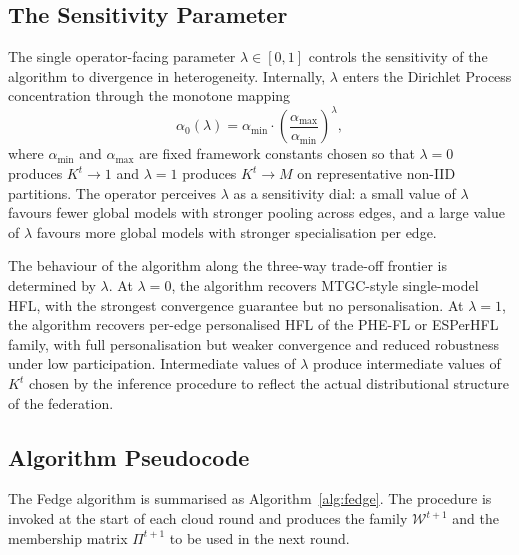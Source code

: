 \subsection{The Sensitivity Parameter}
\label{subsec:fedge-lambda}

The single operator-facing parameter $\lambda \in [0, 1]$ controls the sensitivity of the algorithm to divergence in heterogeneity. Internally, $\lambda$ enters the Dirichlet Process concentration through the monotone mapping
\begin{equation}
\label{eq:lambda-map}
\alpha_0(\lambda) = \alpha_{\min} \cdot \left( \frac{\alpha_{\max}}{\alpha_{\min}} \right)^{\lambda},
\end{equation}
where $\alpha_{\min}$ and $\alpha_{\max}$ are fixed framework constants chosen so that $\lambda = 0$ produces $K^t \to 1$ and $\lambda = 1$ produces $K^t \to M$ on representative non-IID partitions. The operator perceives $\lambda$ as a sensitivity dial: a small value of $\lambda$ favours fewer global models with stronger pooling across edges, and a large value of $\lambda$ favours more global models with stronger specialisation per edge.

The behaviour of the algorithm along the three-way trade-off frontier is determined by $\lambda$. At $\lambda = 0$, the algorithm recovers MTGC-style single-model HFL, with the strongest convergence guarantee but no personalisation. At $\lambda = 1$, the algorithm recovers per-edge personalised HFL of the PHE-FL or ESPerHFL family, with full personalisation but weaker convergence and reduced robustness under low participation. Intermediate values of $\lambda$ produce intermediate values of $K^t$ chosen by the inference procedure to reflect the actual distributional structure of the federation.

\subsection{Algorithm Pseudocode}
\label{subsec:fedge-pseudocode}

The Fedge algorithm is summarised as Algorithm~\ref{alg:fedge}. The procedure is invoked at the start of each cloud round and produces the family $\mathcal{W}^{t+1}$ and the membership matrix $\Pi^{t+1}$ to be used in the next round.

